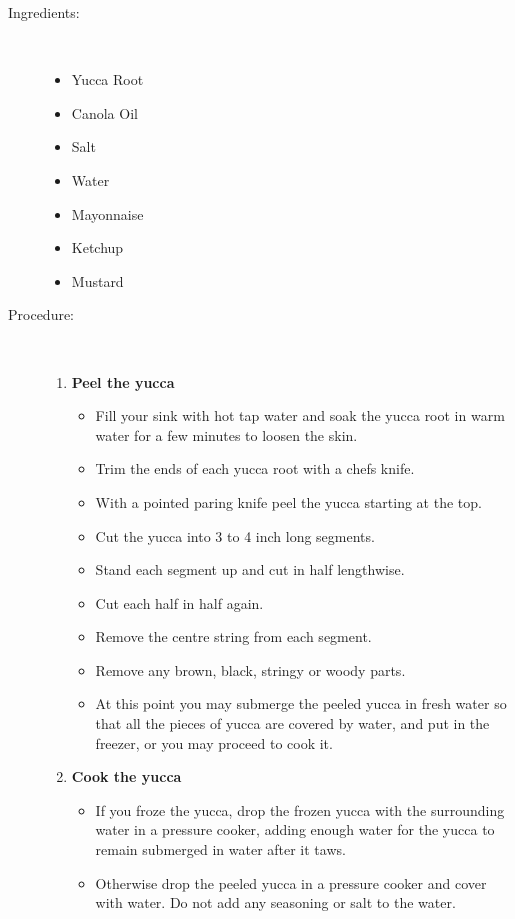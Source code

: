 \documentclass[11pt,letterpaper]{article}
\begin{document}
\begin{description}

\item[Ingredients:]\ \\
	\begin{itemize}
	\item Yucca Root
	\item Canola Oil
	\item Salt
	\item Water
	\item Mayonnaise
	\item Ketchup
	\item Mustard
	\end{itemize}

\item[Procedure:]\ \\
	\begin{enumerate}
	\item {\bf Peel the yucca}
	\begin{itemize}
	\item Fill your sink with hot tap water and soak the yucca root in warm water for a few minutes to loosen the skin.
	\item Trim the ends of each yucca root with a chefs knife.
        \item With a pointed paring knife peel the yucca starting at the top. 
	\item Cut the yucca into 3 to 4 inch long segments.
	\item Stand each segment up and cut in half lengthwise.
	\item Cut each half in half again.
	\item Remove the centre string from each segment.
	\item Remove any brown, black, stringy or woody parts.
	\item At this point you may submerge the peeled yucca in fresh water so that all the pieces of yucca are covered by water, and put in the freezer, or you may proceed to cook it.
	\end{itemize}
	\item {\bf Cook the yucca}
	\begin{itemize}
	\item If you froze the yucca, drop the frozen yucca with the surrounding water in a pressure cooker, adding enough water for the yucca to remain submerged in water after it taws.  
	\item Otherwise drop the peeled yucca in a pressure cooker and cover with water. Do not add any seasoning or salt to the water.

\end{itemize}
\end{enumerate}
\end{description}
\end{document}

